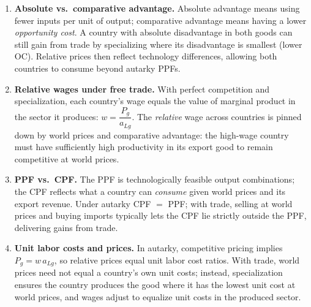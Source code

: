 \documentclass[11pt]{article}
\begin{document}
\begin{enumerate}[leftmargin=*,resume]
\item \textbf{Absolute vs.\ comparative advantage.} Absolute advantage means using fewer inputs per unit of output; comparative advantage means having a lower \emph{opportunity cost}. A country with absolute disadvantage in both goods can still gain from trade by specializing where its disadvantage is smallest (lower OC). Relative prices then reflect technology differences, allowing both countries to consume beyond autarky PPFs.

\item \textbf{Relative wages under free trade.} With perfect competition and specialization, each country's wage equals the value of marginal product in the sector it produces: $w=\dfrac{P_g}{a_{Lg}}$. The \emph{relative} wage across countries is pinned down by world prices and comparative advantage: the high-wage country must have sufficiently high productivity in its export good to remain competitive at world prices.
\newpage
\item \textbf{PPF vs.\ CPF.} The PPF is technologically feasible output combinations; the CPF reflects what a country can \emph{consume} given world prices and its export revenue. Under autarky CPF $=$ PPF; with trade, selling at world prices and buying imports typically lets the CPF lie strictly outside the PPF, delivering gains from trade.

\item \textbf{Unit labor costs and prices.} In autarky, competitive pricing implies $P_g=w\,a_{Lg}$, so relative prices equal unit labor cost ratios. With trade, world prices need not equal a country's own unit costs; instead, specialization ensures the country produces the good where it has the lowest unit cost at world prices, and wages adjust to equalize unit costs in the produced sector.
\end{enumerate}
\end{document}
